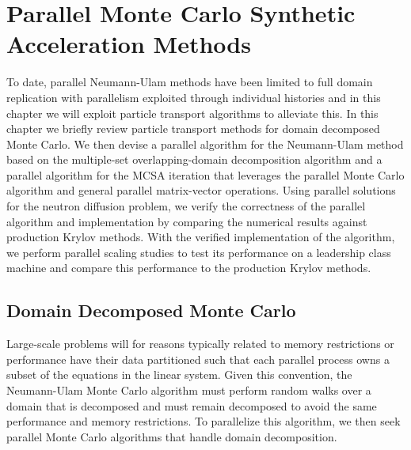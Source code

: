 \chapter{Parallel Monte Carlo Synthetic \\ Acceleration Methods\ }
\label{ch:parallel_methods}

To date, parallel Neumann-Ulam methods have been limited to full
domain replication with parallelism exploited through individual
histories \cite{alexandrov_efficient_1998} and in this chapter we will
exploit particle transport algorithms to alleviate this. In this
chapter we briefly review particle transport methods for domain
decomposed Monte Carlo. We then devise a parallel algorithm for the
Neumann-Ulam method based on the multiple-set overlapping-domain
decomposition algorithm and a parallel algorithm for the MCSA
iteration that leverages the parallel Monte Carlo algorithm and
general parallel matrix-vector operations. Using parallel solutions
for the neutron diffusion problem, we verify the correctness of the
parallel algorithm and implementation by comparing the numerical
results against production Krylov methods. With the verified
implementation of the algorithm, we perform parallel scaling studies
to test its performance on a leadership class machine and compare this
performance to the production Krylov methods.

\section{Domain Decomposed Monte Carlo\ }
\label{sec:msod}
Large-scale problems will for reasons typically related to memory
restrictions or performance have their data partitioned such that each
parallel process owns a subset of the equations in the linear
system. Given this convention, the Neumann-Ulam Monte Carlo algorithm
must perform random walks over a domain that is decomposed and must
remain decomposed to avoid the same performance and memory
restrictions. To parallelize this algorithm, we then seek parallel
Monte Carlo algorithms that handle domain decomposition.

